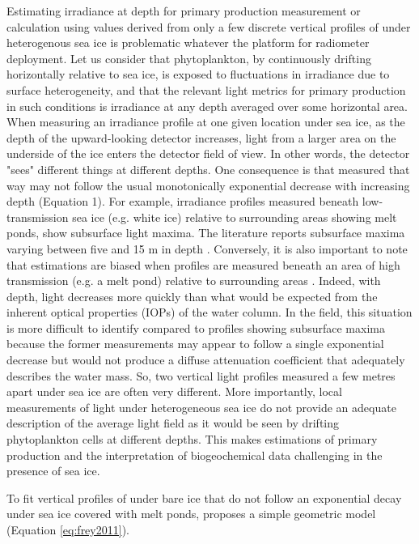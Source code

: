 Estimating irradiance at depth for primary production measurement or calculation using \ked{} values derived from only a few discrete vertical profiles of \edz{} under heterogenous sea ice is problematic whatever the platform for radiometer deployment. Let us consider that phytoplankton, by continuously drifting horizontally relative to sea ice, is exposed to fluctuations in irradiance due to surface heterogeneity, and that the relevant light metrics for primary production in such conditions is irradiance at any depth averaged over some horizontal area. When measuring an irradiance profile at one given location under sea ice, as the depth of the upward-looking detector increases, light from a larger area on the underside of the ice enters the detector field of view. In other words, the detector "sees" different things at different depths. One consequence is that \edz{} measured that way may not follow the usual monotonically exponential decrease with increasing depth (Equation 1). For example, irradiance profiles measured beneath low-transmission sea ice (e.g. white ice) relative to surrounding areas showing melt ponds, show subsurface light maxima. The literature reports subsurface maxima varying between five and 15 m in depth \citep{Frey2011, Katlein2016, Laney2017}. Conversely, it is also important to note that \ked{} estimations are biased when profiles are measured beneath an area of high transmission (e.g. a melt pond) relative to surrounding areas \citep{Katlein2016}. Indeed, with depth, light decreases more quickly than what would be expected from the inherent optical properties (IOPs) of the water column. In the field, this situation is more difficult to identify compared to profiles showing subsurface maxima because the former measurements may appear to follow a single exponential decrease but would not produce a diffuse attenuation coefficient that adequately describes the water mass. So, two vertical light profiles measured a few metres apart under sea ice are often very different. More importantly, local measurements of light under heterogeneous sea ice do not provide an adequate description of the average light field as it would be seen by drifting phytoplankton cells at different depths. This makes estimations of primary production and the interpretation of biogeochemical data challenging in the presence of sea ice.

To fit vertical profiles of \edz{} under bare ice that do not follow an exponential decay under sea ice covered with melt ponds, \citet{Frey2011} proposes a simple geometric model (Equation \ref{eq:frey2011}). 

